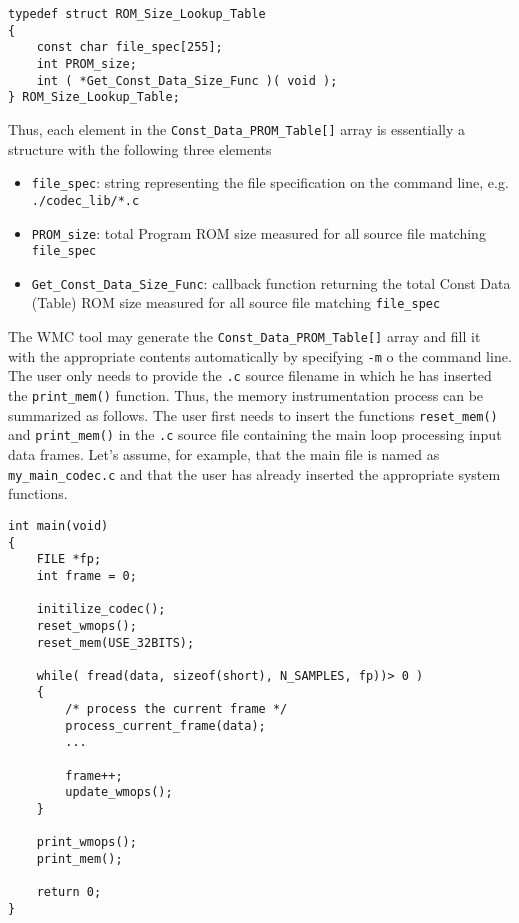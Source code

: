 \begin{Verbatim}[fontsize=\small]
typedef struct ROM_Size_Lookup_Table
{
    const char file_spec[255];
    int PROM_size;
    int ( *Get_Const_Data_Size_Func )( void );
} ROM_Size_Lookup_Table;
\end{Verbatim}

Thus, each element in the \verb|Const_Data_PROM_Table[]| array is essentially a structure with the following three elements

\begin{itemize}
  \item \verb|file_spec|: string representing the file specification on the command line, e.g. \verb|./codec_lib/*.c|
  \item \verb|PROM_size|: total Program ROM size measured for all source file matching \verb|file_spec|
  \item \verb|Get_Const_Data_Size_Func|: callback function returning the total Const Data (Table) ROM size measured for all source file matching \verb|file_spec|
\end{itemize}

The WMC tool may generate the \verb|Const_Data_PROM_Table[]| array and fill it with the appropriate contents automatically by specifying \verb|-m| o the command line. The user only needs to provide the \verb|.c| source filename in which he has inserted the \verb|print_mem()| function. Thus, the memory instrumentation process can be summarized as follows. The user first needs to insert the functions \verb|reset_mem()| and \verb|print_mem()| in the \verb|.c| source file containing the main loop processing input data frames. Let's assume, for example, that the main file is named as \verb|my_main_codec.c| and that the user has already inserted the appropriate system functions. 

\begin{Verbatim}[fontsize=\small]
int main(void)
{
    FILE *fp;
    int frame = 0;
    
    initilize_codec();
    reset_wmops();
    reset_mem(USE_32BITS);

    while( fread(data, sizeof(short), N_SAMPLES, fp))> 0 )
    {
        /* process the current frame */
        process_current_frame(data);
        ...
        
        frame++;
        update_wmops();
    }

    print_wmops();
    print_mem();
    
    return 0;
}
\end{Verbatim}

